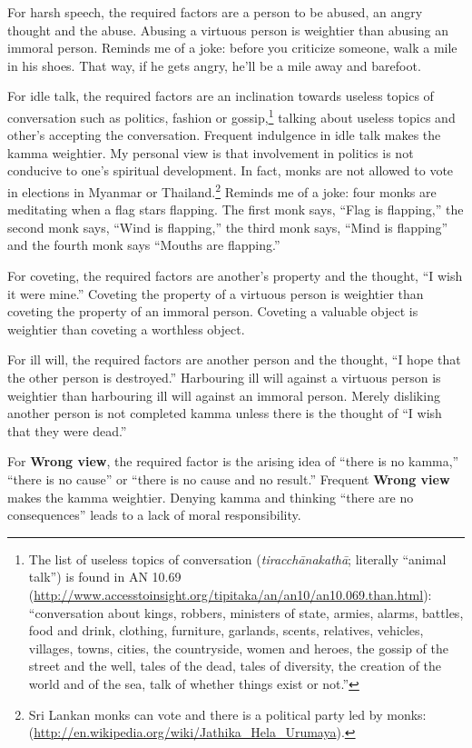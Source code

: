 For harsh speech, the required factors are a person to be abused, an angry thought and the abuse. Abusing a virtuous person is weightier than abusing an immoral person. Reminds me of a joke: before you criticize someone, walk a mile in his shoes. That way, if he gets angry, he’ll be a mile away and barefoot.

For idle talk, the required factors are an inclination towards useless topics of conversation such as politics, fashion or gossip,\footnote{The list of useless topics of conversation (\textit{tiracchānakathā}; literally “animal talk”) is found in AN 10.69 (\url{http://www.accesstoinsight.org/tipitaka/an/an10/an10.069.than.html}): “conversation about kings, robbers, ministers of state, armies, alarms, battles, food and drink, clothing, furniture, garlands, scents, relatives, vehicles, villages, towns, cities, the countryside, women and heroes, the gossip of the street and the well, tales of the dead, tales of diversity, the creation of the world and of the sea, talk of whether things exist or not.”} talking about useless topics and other’s accepting the conversation. Frequent indulgence in idle talk makes the kamma weightier. My personal view is that involvement in politics is not conducive to one’s spiritual development. In fact, monks are not allowed to vote in elections in Myanmar or Thailand.\footnote{Sri Lankan monks can vote and there is a political party led by monks: (\url{http://en.wikipedia.org/wiki/Jathika_Hela_Urumaya}).} Reminds me of a joke: four monks are meditating when a flag stars flapping. The first monk says, “Flag is flapping,” the second monk says, “Wind is flapping,” the third monk says, “Mind is flapping” and the fourth monk says “Mouths are flapping.”

For coveting, the required factors are another’s property and the thought, “I wish it were mine.” Coveting the property of a virtuous person is weightier than coveting the property of an immoral person. Coveting a valuable object is weightier than coveting a worthless object.

For ill will, the required factors are another person and the thought, “I hope that the other person is destroyed.” Harbouring ill will against a virtuous person is weightier than harbouring ill will against an immoral person. Merely disliking another person is not completed kamma unless there is the thought of “I wish that they were dead.”

For \textbf{Wrong view}, the required factor is the arising idea of “there is no kamma,” “there is no cause” or “there is no cause and no result.” Frequent \textbf{Wrong view} makes the kamma weightier. Denying kamma and thinking “there are no consequences” leads to a lack of moral responsibility.

